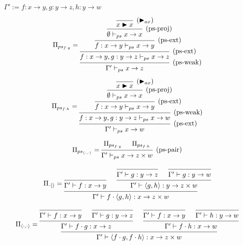\documentclass[conference]{IEEEtran}
\begin{document}
\begin{enumerate}
		$\Gamma' := f : x \rightarrow y, g : y \rightarrow z, h : y \rightarrow w$
		
		\begin{align*}
			\Pi_{ps_{f \cdot g}} =
			\begin{prooftree}
				\infer0[($\blacktriangleright_{ax}$)]{x \blacktriangleright x}
				\infer1[(ps-proj)]{\emptyset \vdash_{ps} x \rightarrow x}
				\infer1[(ps-ext)]{f : x \rightarrow y \vdash_{ps} x \rightarrow y}
				\infer1[(ps-ext)]{f : x \rightarrow y, g : y \rightarrow z \vdash_{ps} x \rightarrow z}
				\infer1[(ps-weak)]{\Gamma' \vdash_{ps} x \rightarrow z}
			\end{prooftree}
		\end{align*}
		
		\begin{align*}
			\Pi_{ps_{f \cdot h}} =
			\begin{prooftree}
				\infer0[($\blacktriangleright_{ax}$)]{x \blacktriangleright x}
				\infer1[(ps-proj)]{\emptyset \vdash_{ps} x \rightarrow x}
				\infer1[(ps-ext)]{f : x \rightarrow y \vdash_{ps} x \rightarrow y}
				\infer1[(ps-weak)]{f : x \rightarrow y, g : y \rightarrow z \vdash_{ps} x \rightarrow w}
				\infer1[(ps-ext)]{\Gamma' \vdash_{ps} x \rightarrow w}
			\end{prooftree}
		\end{align*}
		
		\begin{align*}
			\Pi_{ps_{\left<\cdot,\cdot\right>}} =
			\begin{prooftree}
				\hypo[]{\Pi_{ps_{f \cdot g}}}
				\hypo[]{\Pi_{ps_{f \cdot h}}}
				\infer2[(ps-pair)]{\Gamma' \vdash_{ps} x \rightarrow z \times w}
			\end{prooftree}
		\end{align*}
		
		\begin{align*}
			\Pi_{\cdot\left<\right>} =
			\begin{prooftree}
				\infer0[]{\Gamma' \vdash f : x \rightarrow y}
				\infer0[]{\Gamma' \vdash g : y \rightarrow z}
				\infer0[]{\Gamma' \vdash g : y \rightarrow w}
				\infer2[]{\Gamma' \vdash \left< g , h \right> : y \rightarrow z \times w}
				\infer2[]{\Gamma' \vdash f \cdot \left<g, h\right> : x \rightarrow z \times w}
			\end{prooftree}
		\end{align*}
		
		\begin{align*}
			\Pi_{\left<\cdot , \cdot\right>} =
			\begin{prooftree}
				\infer0[]{\Gamma' \vdash f : x \rightarrow y}
				\infer0[]{\Gamma' \vdash g : y \rightarrow z}
				\infer2[]{\Gamma' \vdash f \cdot g : x \rightarrow z}
				\infer0[]{\Gamma' \vdash f : x \rightarrow y}
				\infer0[]{\Gamma' \vdash h : y \rightarrow w}
				\infer2[]{\Gamma' \vdash f \cdot h : x \rightarrow w}
				\infer2[]{\Gamma' \vdash \left< f \cdot g , f \cdot h \right> : x \rightarrow z \times w}
			\end{prooftree}
		\end{align*}
		\vspace{15pt}
		

\end{enumerate}
\end{document}
